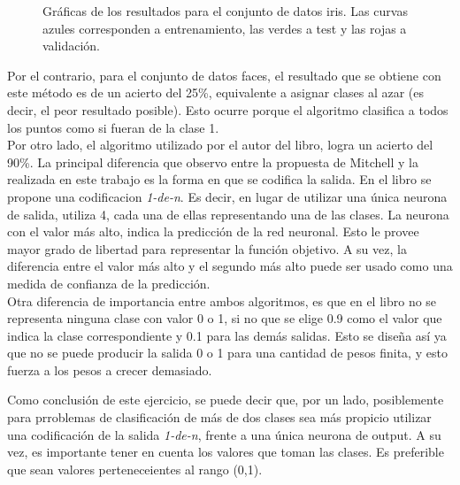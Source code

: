 \documentclass[12pt, a4paper]{article}
\begin{document}
\begin{figure}
   \caption{Gráficas de los resultados para el conjunto de datos iris. Las curvas azules corresponden a entrenamiento, las verdes a test y las rojas a validación.}
\end{figure}

\bigskip
Por el contrario, para el conjunto de datos faces, el resultado que se obtiene con este método es de un acierto del 25\%, equivalente a asignar clases al azar (es decir, el peor resultado posible). Esto ocurre porque el algoritmo clasifica a todos los puntos como si fueran de la clase 1. \\
Por otro lado, el algoritmo utilizado por el autor del libro, logra un acierto del 90\%. La principal diferencia que observo entre la propuesta de Mitchell y la realizada en este trabajo es la forma en que se codifica la salida. En el libro se propone una codificacion \textit{1-de-n}. Es decir, en lugar de utilizar una única neurona de salida, utiliza 4, cada una de ellas representando una de las clases. La neurona con el valor más alto, indica la predicción de la red neuronal. Esto le  provee mayor grado de libertad para representar la función objetivo. A su vez, la diferencia entre el valor más alto y el segundo más alto puede ser usado como una medida de confianza de la predicción.\\
Otra diferencia de importancia entre ambos algoritmos, es que en el libro no se representa ninguna clase con valor 0 o 1, si no que se elige 0.9 como el valor que indica la clase correspondiente y 0.1 para las demás salidas. Esto se diseña así ya que no se puede producir la salida 0 o 1 para una cantidad de pesos finita, y esto fuerza a los pesos a crecer demasiado. 

\bigskip
Como conclusión de este ejercicio, se puede decir que, por un lado, posiblemente para prroblemas de clasificación de más de dos clases sea más propicio utilizar una codificación de la salida \textit{1-de-n}, frente a una única neurona de output. A su vez, es importante tener en cuenta los valores que toman las clases. Es preferible que sean valores perteneceientes al rango (0,1).
\end{document}
